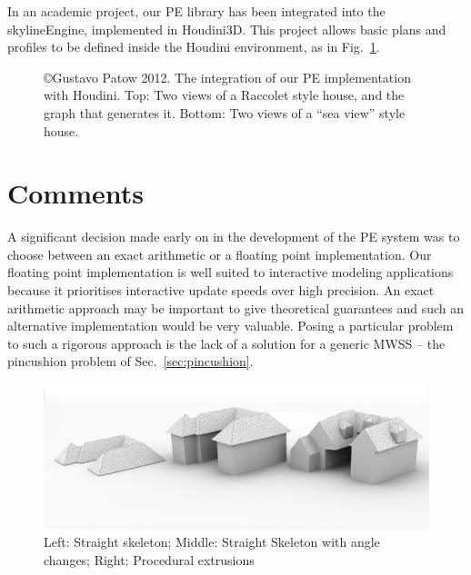 In an academic project, our PE library has been integrated into the skylineEngine\cite{skyline}, implemented in Houdini3D\cite{houdini}. This project allows basic plans and profiles to be defined inside the Houdini environment, as in Fig.~\ref{fig:houdini_integration}.

\begin{figure}
  \centering
  \def\svgwidth{1.0\columnwidth}
  
  \caption[Integration with Houdini.]{\label{fig:houdini_integration}\copyright Gustavo Patow 2012. The integration of our PE implementation with Houdini. Top: Two views of a Raccolet style house, and the graph that generates it. Bottom: Two views of a ``sea view'' style house.}
\end{figure}

\FloatBarrier
\section{Comments}

A significant decision made early on in the development of the PE system was to choose between an exact arithmetic or a floating point implementation. Our floating point implementation is well suited to interactive modeling applications because it prioritises interactive update speeds over high precision. An exact arithmetic approach may be important to give theoretical guarantees and such an alternative implementation would be very valuable. Posing a particular problem to such a rigorous approach is the lack of a solution for a generic MWSS -- the pincushion problem of Sec.~\ref{sec:pincushion}.

\begin{figure}
  \centering
  \includegraphics[width=1.0\columnwidth]{comparison.png}
  \caption[Comparison of PEs with previous systems]{\label{fig:Comparison}Left: Straight skeleton; Middle: Straight Skeleton with angle changes; Right: Procedural extrusions}
\end{figure}


